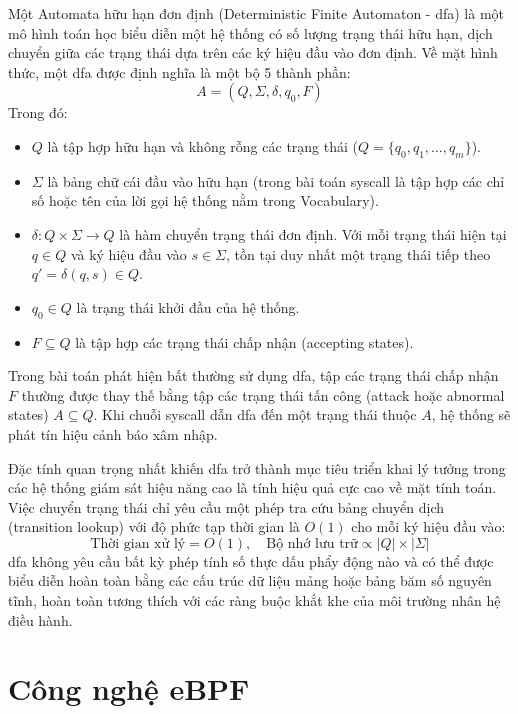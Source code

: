 \documentclass[../main.tex]{subfiles}
\begin{document}
Một Automata hữu hạn đơn định (Deterministic Finite Automaton - \gls{dfa})
là một mô hình toán học biểu diễn một hệ thống có số lượng trạng thái
hữu hạn, dịch chuyển giữa các trạng thái dựa trên các ký hiệu đầu vào
đơn định. Về mặt hình thức, một \gls{dfa} được định nghĩa là một bộ 5 thành phần:
\begin{equation}
  A = (Q, \Sigma, \delta, q_0, F)
\end{equation}
Trong đó:
\begin{itemize}
  \item $Q$ là tập hợp hữu hạn và không rỗng các trạng thái ($Q =
    \{q_0, q_1, \ldots, q_m\}$).
  \item $\Sigma$ là bảng chữ cái đầu vào hữu hạn (trong bài toán
      \gls{syscall} là tập hợp các chỉ số hoặc tên của lời gọi hệ thống nằm
    trong Vocabulary).
  \item $\delta: Q \times \Sigma \to Q$ là hàm chuyển trạng thái đơn
    định. Với mỗi trạng thái hiện tại $q \in Q$ và ký hiệu đầu vào $s
    \in \Sigma$, tồn tại duy nhất một trạng thái tiếp theo $q' =
    \delta(q, s) \in Q$.
  \item $q_0 \in Q$ là trạng thái khởi đầu của hệ thống.
  \item $F \subseteq Q$ là tập hợp các trạng thái chấp nhận (accepting states).
\end{itemize}

Trong bài toán phát hiện bất thường sử dụng \gls{dfa}, tập các trạng thái
chấp nhận $F$ thường được thay thế bằng tập các trạng thái tấn công
(attack hoặc abnormal states) $A \subseteq Q$. Khi chuỗi \gls{syscall} dẫn
\gls{dfa} đến một trạng thái thuộc $A$, hệ thống sẽ phát tín hiệu cảnh báo xâm nhập.

Đặc tính quan trọng nhất khiến \gls{dfa} trở thành mục tiêu triển khai lý
tưởng trong các hệ thống giám sát hiệu năng cao là tính hiệu quả cực
cao về mặt tính toán. Việc chuyển trạng thái chỉ yêu cầu một phép tra
cứu bảng chuyển dịch (transition lookup) với độ phức tạp thời gian là
$O(1)$ cho mỗi ký hiệu đầu vào:
\begin{equation}
  \text{Thời gian xử lý} = O(1), \quad \text{Bộ nhớ lưu trữ} \propto
  |Q| \times |\Sigma|
\end{equation}
\gls{dfa} không yêu cầu bất kỳ phép tính số thực dấu phẩy động nào và có
thể được biểu diễn hoàn toàn bằng các cấu trúc dữ liệu mảng hoặc bảng
băm số nguyên tĩnh, hoàn toàn tương thích với các ràng buộc khắt khe
của môi trường nhân hệ điều hành.

\section{Công nghệ eBPF}
\label{sec:ebpf}
\end{document}
